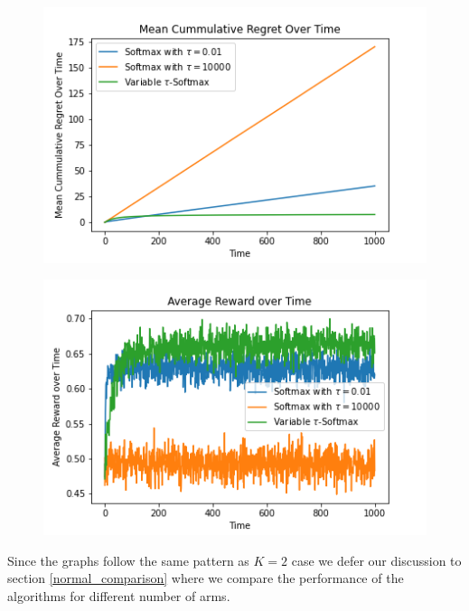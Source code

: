 \documentclass{article}
\begin{document}
		\begin{figure}[H]
		\graphicspath{ {../Experiments/Normal_5_0.01_All/} }
		\centering
		\begin{minipage}{.5\textwidth}
		  \centering
		  \includegraphics[width=\linewidth]{Mean_Cummulative_Regret_Over_Time.png}
		  \label{fig:test1}
		\end{minipage}%
		\begin{minipage}{.5\textwidth}
		  \centering
		  \includegraphics[width=\linewidth]{Average_Reward_over_Time.png}
		  \label{fig:test2}
		\end{minipage}
		\end{figure}
		
		Since the graphs follow the same pattern as $K=2$ case we defer our discussion to section \ref{normal_comparison} where we compare the performance of the algorithms for
		different number of arms.
		
\end{document}
